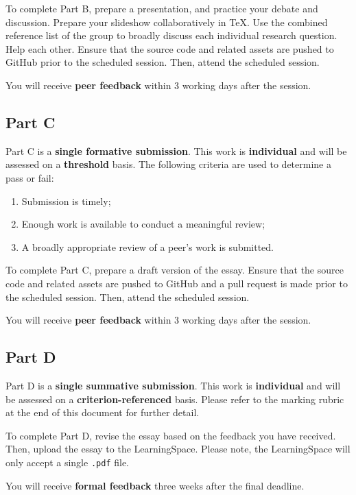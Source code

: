 \documentclass{../../fal_assignment}
\begin{document}
To complete Part B, prepare a presentation, and practice your debate and discussion. Prepare your slideshow collaboratively in TeX. Use the combined reference list of the group to broadly discuss each individual research question. Help each other. Ensure that the source code and related assets are pushed to GitHub prior to the scheduled session. Then, attend the scheduled session.

You will receive \textbf{peer feedback} within 3 working days after the session.

\subsection*{Part C}

Part C is a \textbf{single formative submission}. This work is \textbf{individual} and will be assessed on a \textbf{threshold} basis. The following criteria are used to determine a pass or fail:

\begin{enumerate}[label=(\alph*)]
	\item Submission is timely;
	\item Enough work is available to conduct a meaningful review;
	\item A broadly appropriate review of a peer's work is submitted.
\end{enumerate}

To complete Part C, prepare a draft version of the essay. Ensure that the source code and related assets are pushed to GitHub and a pull request is made prior to the scheduled session. Then, attend the scheduled session.

You will receive \textbf{peer feedback} within 3 working days after the session.

\subsection*{Part D}

Part D is a \textbf{single summative submission}. This work is \textbf{individual} and will be assessed on a \textbf{criterion-referenced} basis. Please refer to the marking rubric at the end of this document for further detail.

To complete Part D, revise the essay based on the feedback you have received. Then, upload the essay to the LearningSpace. Please note, the LearningSpace will only accept a single \texttt{.pdf} file.

You will receive \textbf{formal feedback} three weeks after the final deadline.
\end{document}
